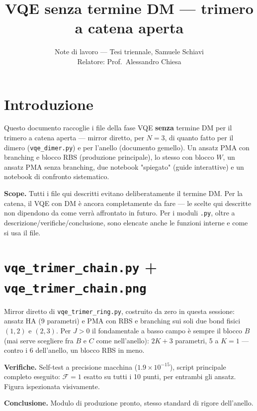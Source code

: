 \documentclass[11pt,a4paper]{article}
\title{VQE senza termine DM — trimero a catena aperta}
\author{Note di lavoro — Tesi triennale, Samuele Schiavi\\ Relatore: Prof.\ Alessandro Chiesa}
\date{}
\begin{document}
\maketitle

\section*{Introduzione}

Questo documento raccoglie i file della fase VQE \textbf{senza} termine DM per il
trimero a catena aperta — mirror diretto, per $N=3$, di quanto fatto per il dimero
(\texttt{vqe\_dimer.py}) e per l'anello (documento gemello). Un ansatz PMA con
branching e blocco RBS (produzione principale), lo stesso con blocco $W$, un ansatz
PMA senza branching, due notebook "spiegato" (guide interattive) e un notebook di
confronto sistematico.

\textbf{Scope.} Tutti i file qui descritti evitano deliberatamente il termine DM. Per
la catena, il VQE con DM è ancora completamente da fare — le scelte qui descritte non
dipendono da come verrà affrontato in futuro. Per i moduli \texttt{.py}, oltre a
descrizione/verifiche/conclusione, sono elencate anche le funzioni interne e come si
usa il file.

\section*{\texttt{vqe\_trimer\_chain.py} + \texttt{vqe\_trimer\_chain.png}}

Mirror diretto di \texttt{vqe\_trimer\_ring.py}, costruito da zero in questa sessione:
ansatz HA (9 parametri) e PMA con RBS e branching sui soli due bond fisici $(1,2)$ e
$(2,3)$. Per $J>0$ il fondamentale a basso campo è sempre il blocco $B$ (mai serve
scegliere fra $B$ e $C$ come nell'anello): $2K+3$ parametri, 5 a $K=1$ — contro i 6
dell'anello, un blocco RBS in meno.

\textbf{Verifiche.} Self-test a precisione macchina ($1.9\times10^{-15}$), script
principale completo eseguito: $\mathcal F=1$ esatto su tutti i 10 punti, per entrambi
gli ansatz. Figura ispezionata visivamente.

\textbf{Conclusione.} Modulo di produzione pronto, stesso standard di rigore
dell'anello.
\end{document}
